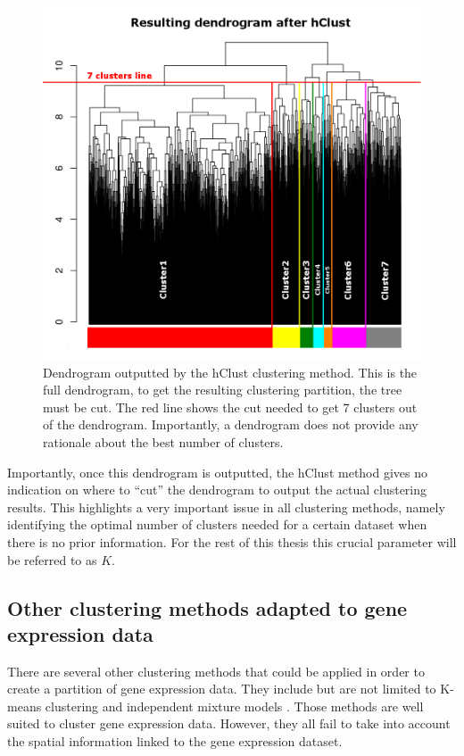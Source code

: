	\begin{figure}[h]
\centerline{\includegraphics[width=\linewidth]{gfx/chapter3/dendro.png}}
\caption{Dendrogram outputted by the hClust clustering method. This is the full dendrogram, to get the resulting clustering partition, the tree must be cut. The red line shows the cut needed to get 7 clusters out of the dendrogram. Importantly, a dendrogram does not provide any rationale about the best number of clusters.}\label{fig:dendro}
	\end{figure}	
	
	Importantly, once this dendrogram is outputted, the hClust method gives no indication on where to ``cut'' the dendrogram to output the actual clustering results. This highlights a very important issue in all clustering methods, namely identifying the optimal number of clusters needed for a certain dataset when there is no prior information. For the rest of this thesis this crucial parameter will be referred to as $K$.\\

 
	\subsection{Other clustering methods adapted to gene expression data}
	There are several other clustering methods that could be applied in order to create a partition of gene expression data. They include but are not limited to K-means clustering \citep{macqueen67} and independent mixture models \citep{dempster77}. Those methods are well suited to cluster gene expression data. However, they all fail to take into account the spatial information linked to the gene expression dataset.


